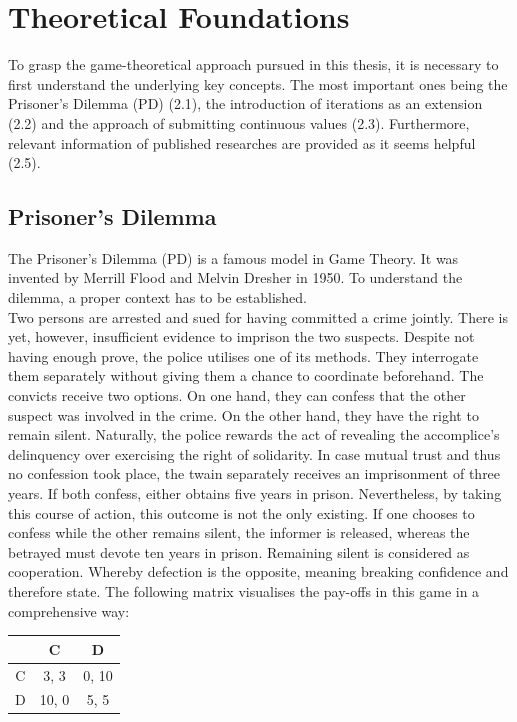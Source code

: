 \documentclass{article}
\begin{document}
\section{Theoretical Foundations}

To grasp the game-theoretical approach pursued in this thesis, it is necessary to first understand the underlying key concepts. 
The most important ones being the Prisoner's Dilemma (PD) (2.1), the introduction of iterations as an extension (2.2) and the approach of submitting continuous values (2.3).
Furthermore, relevant information of published researches are provided as it seems helpful (2.5).

\subsection{Prisoner's Dilemma}
		
The Prisoner's Dilemma (PD) is a famous model in Game Theory. 
It was invented by Merrill Flood and Melvin Dresher in 1950. 
To understand the dilemma, a proper context has to be established.\\
Two persons are arrested and sued for having committed a crime jointly.
There is yet, however, insufficient evidence to imprison the two suspects.
Despite not having enough prove, the police utilises one of its methods.
They interrogate them separately without giving them a chance to coordinate beforehand.
The convicts receive two options.
On one hand, they can confess that the other suspect was involved in the crime. 
On the other hand, they have the right to remain silent.
Naturally, the police rewards the act of revealing the accomplice's delinquency over exercising the right of solidarity.
In case mutual trust and thus no confession took place, the twain separately receives an imprisonment of three years.
If both confess, either obtains five years in prison.
Nevertheless, by taking this course of action, this outcome is not the only existing.
If one chooses to confess while the other remains silent, the informer is released, whereas the betrayed must devote ten years in prison.
Remaining silent is considered as cooperation.
Whereby defection is the opposite, meaning breaking confidence and therefore state.
The following matrix visualises the pay-offs in this game in a comprehensive way:

\begin{center}
\begin{tabular}{ c|c|c }
   & C & D \\ 
   \hline
 C & 3, 3 & 0, 10\\  
   \hline
 D & 10, 0 & 5, 5
\end{tabular}
\end{center}
\end{document}

